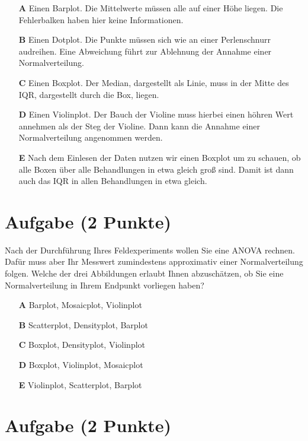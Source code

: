 \documentclass[a4paper, 9pt]{scrartcl}\usepackage[]{graphicx}\usepackage[]{xcolor}
\begin{document}
\begin{enumerate}
\item [\textbf{A} \msquare] Einen Barplot. Die Mittelwerte müssen alle auf einer Höhe liegen. Die Fehlerbalken haben hier keine Informationen.
\item [\textbf{B} \msquare] Einen Dotplot. Die Punkte müssen sich wie an einer Perlenschnurr audreihen. Eine Abweichung führt zur Ablehnung der Annahme einer Normalverteilung.
\item [\textbf{C} \msquare] Einen Boxplot. Der Median, dargestellt als Linie, muss in der Mitte des IQR, dargestellt durch die Box, liegen.
\item [\textbf{D} \msquare] Einen Violinplot. Der Bauch der Violine muss hierbei einen höhren Wert annehmen als der Steg der Violine. Dann kann die Annahme einer Normalverteilung angenommen werden.
\item [\textbf{E} \msquare] Nach dem Einlesen der Daten nutzen wir einen Boxplot um zu schauen, ob alle Boxen über alle Behandlungen in etwa gleich groß sind. Damit ist dann auch das IQR in allen Behandlungen in etwa gleich.
\end{enumerate}

\section{Aufgabe \hfill (2 Punkte)}




Nach der Durchführung Ihres Feldexperiments wollen Sie eine ANOVA rechnen. Dafür muss aber Ihr Messwert zumindestens approximativ einer Normalverteilung folgen. Welche der drei Abbildungen erlaubt Ihnen abzuschätzen, ob Sie eine Normalverteilung in Ihrem Endpunkt vorliegen haben?





\begin{enumerate}
\item [\textbf{A} \msquare] Barplot, Mosaicplot, Violinplot
\item [\textbf{B} \msquare] Scatterplot, Densityplot, Barplot
\item [\textbf{C} \msquare] Boxplot, Densityplot, Violinplot
\item [\textbf{D} \msquare] Boxplot, Violinplot, Mosaicplot
\item [\textbf{E} \msquare] Violinplot, Scatterplot, Barplot
\end{enumerate} 

\section{Aufgabe \hfill (2 Punkte)}
\end{document}
